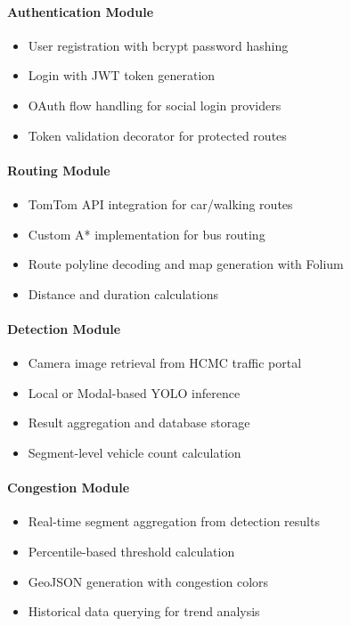 \paragraph{Authentication Module}
\begin{itemize}[noitemsep]
    \item User registration with bcrypt password hashing
    \item Login with JWT token generation
    \item OAuth flow handling for social login providers
    \item Token validation decorator for protected routes
\end{itemize}

\paragraph{Routing Module}
\begin{itemize}[noitemsep]
    \item TomTom API integration for car/walking routes
    \item Custom A* implementation for bus routing
    \item Route polyline decoding and map generation with Folium
    \item Distance and duration calculations
\end{itemize}

\paragraph{Detection Module}
\begin{itemize}[noitemsep]
    \item Camera image retrieval from HCMC traffic portal
    \item Local or Modal-based YOLO inference
    \item Result aggregation and database storage
    \item Segment-level vehicle count calculation
\end{itemize}

\paragraph{Congestion Module}
\begin{itemize}[noitemsep]
    \item Real-time segment aggregation from detection results
    \item Percentile-based threshold calculation
    \item GeoJSON generation with congestion colors
    \item Historical data querying for trend analysis
\end{itemize}

